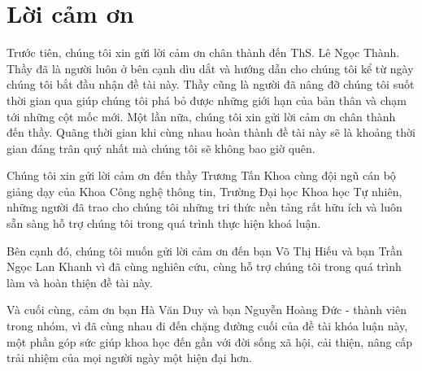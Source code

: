 \chapter*{Lời cảm ơn}
\label{thanks}

Trước tiên, chúng tôi xin gửi lời cảm ơn chân thành đến ThS. Lê Ngọc Thành. Thầy đã là người luôn ở bên cạnh dìu dắt và hướng dẫn cho chúng tôi kể từ ngày chúng tôi bắt đầu nhận đề tài này. Thầy cũng là người đã nâng đỡ chúng tôi suốt thời gian qua giúp chúng tôi phá bỏ được những giới hạn của bản thân và chạm tới những cột mốc mới. Một lần nữa, chúng tôi xin gửi lời cảm ơn chân thành đến thầy. Quãng thời gian khi cùng nhau hoàn thành đề tài này sẽ là khoảng thời gian đáng trân quý nhất mà chúng tôi sẽ không bao giờ quên. 

Chúng tôi xin gửi lời cảm ơn đến thầy Trương Tấn Khoa cùng đội ngũ cán bộ giảng dạy của Khoa Công nghệ thông tin, Trường Đại học Khoa học Tự nhiên, những người đã trao cho chúng tôi những tri thức nền tảng rất hữu ích và luôn sẵn sàng hỗ trợ chúng tôi trong quá trình thực hiện khoá luận.

Bên cạnh đó, chúng tôi muốn gửi lời cảm ơn đến bạn Võ Thị Hiếu và bạn Trần Ngọc Lan Khanh vì đã cùng nghiên cứu, cùng hỗ trợ chúng tôi trong quá trình làm và hoàn thiện đề tài này.

Và cuối cùng, cảm ơn bạn Hà Văn Duy và bạn Nguyễn Hoàng Đức - thành viên trong nhóm, vì đã cùng nhau đi đến chặng đường cuối của đề tài khóa luận này, một phần góp sức giúp khoa học đến gần với đời sống xã hội, cải thiện, nâng cấp trải nhiệm của mọi người ngày một hiện đại hơn.
